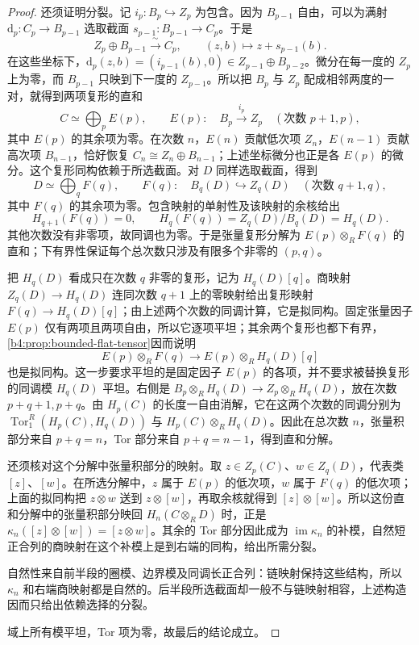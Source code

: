 \begin{proof}
	还须证明分裂。记 \(i_p:B_p\hookrightarrow Z_p\) 为包含。因为 \(B_{p-1}\) 自由，可以为满射 \(\mathrm d_p:C_p\to B_{p-1}\) 选取截面 \(s_{p-1}:B_{p-1}\to C_p\)。于是
	\[
		Z_p\oplus B_{p-1}\xrightarrow{\ \sim\ }C_p, \qquad (z,b)\longmapsto z+s_{p-1}(b).
	\]
	在这些坐标下，\(\mathrm d_p(z,b)=(i_{p-1}(b),0)\in Z_{p-1}\oplus B_{p-2}\)。微分在每一度的 \(Z_p\) 上为零，而 \(B_{p-1}\) 只映到下一度的 \(Z_{p-1}\)。所以把 \(B_p\) 与 \(Z_p\) 配成相邻两度的一对，就得到两项复形的直和
	\[
		C\simeq\bigoplus_p E(p),\qquad E(p):\quad B_p\xrightarrow{i_p}Z_p \quad(\text{次数 }p+1,p),
	\]
	其中 \(E(p)\) 的其余项为零。在次数 \(n\)，\(E(n)\) 贡献低次项 \(Z_n\)，\(E(n-1)\) 贡献高次项 \(B_{n-1}\)，恰好恢复 \(C_n\cong Z_n\oplus B_{n-1}\)；上述坐标微分也正是各 \(E(p)\) 的微分。这个复形同构依赖于所选截面。对 \(D\) 同样选取截面，得到
	\[
		D\simeq\bigoplus_q F(q),\qquad F(q):\quad B_q(D)\hookrightarrow Z_q(D) \quad(\text{次数 }q+1,q),
	\]
	其中 \(F(q)\) 的其余项为零。包含映射的单射性及该映射的余核给出
	\[
		H_{q+1}(F(q))=0,\qquad H_q(F(q))=Z_q(D)/B_q(D)=H_q(D).
	\]
	其他次数没有非零项，故同调也为零。于是张量复形分解为 \(E(p)\otimes_R F(q)\) 的直和；下有界性保证每个总次数只涉及有限多个非零的 \((p,q)\)。

	把 \(H_q(D)\) 看成只在次数 \(q\) 非零的复形，记为 \(H_q(D)[q]\)。商映射 \(Z_q(D)\to H_q(D)\) 连同次数 \(q+1\) 上的零映射给出复形映射 \(F(q)\to H_q(D)[q]\)；由上述两个次数的同调计算，它是拟同构。固定张量因子 \(E(p)\) 仅有两项且两项自由，所以它逐项平坦；其余两个复形也都下有界，\cref{b4:prop:bounded-flat-tensor}因而说明
	\[
		E(p)\otimes_R F(q)\longrightarrow E(p)\otimes_R H_q(D)[q]
	\]
	也是拟同构。这一步要求平坦的是固定因子 \(E(p)\) 的各项，并不要求被替换复形的同调模 \(H_q(D)\) 平坦。右侧是 \(B_p\otimes_R H_q(D)\to Z_p\otimes_R H_q(D)\)，放在次数 \(p+q+1,p+q\)。由 \(H_p(C)\) 的长度一自由消解，它在这两个次数的同调分别为 \(\operatorname{Tor}_1^R(H_p(C),H_q(D))\) 与 \(H_p(C)\otimes_R H_q(D)\)。因此在总次数 \(n\)，张量积部分来自 \(p+q=n\)，Tor 部分来自 \(p+q=n-1\)，得到直和分解。

	还须核对这个分解中张量积部分的映射。取 \(z\in Z_p(C)\)、\(w\in Z_q(D)\)，代表类 \([z]\)、\([w]\)。在所选分解中，\(z\) 属于 \(E(p)\) 的低次项，\(w\) 属于 \(F(q)\) 的低次项；上面的拟同构把 \(z\otimes w\) 送到 \(z\otimes[w]\)，再取余核就得到 \([z]\otimes[w]\)。所以这份直和分解中的张量积部分映回 \(H_n(C\otimes_R D)\) 时，正是 \(\kappa_n([z]\otimes[w])=[z\otimes w]\)。其余的 Tor 部分因此成为 \(\operatorname{im}\kappa_n\) 的补模，自然短正合列的商映射在这个补模上是到右端的同构，给出所需分裂。

	自然性来自前半段的圈模、边界模及同调长正合列：链映射保持这些结构，所以 \(\kappa_n\) 和右端商映射都是自然的。后半段所选截面却一般不与链映射相容，上述构造因而只给出依赖选择的分裂。

	域上所有模平坦，Tor 项为零，故最后的结论成立。
\end{proof}

